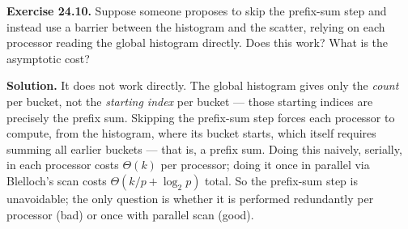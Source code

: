\begin{ppexercises}
\textbf{Exercise 24.10.} Suppose someone proposes to skip the prefix-sum
step and instead use a barrier between the histogram and the scatter,
relying on each processor reading the global histogram directly. Does
this work? What is the asymptotic cost?

\medskip
\textbf{Solution.} It does not work directly. The global histogram
gives only the \emph{count} per bucket, not the \emph{starting index}
per bucket --- those starting indices are precisely the prefix sum.
Skipping the prefix-sum step forces each processor to compute, from
the histogram, where its bucket starts, which itself requires summing
all earlier buckets --- that is, a prefix sum. Doing this naively,
serially, in each processor costs $\Theta(k)$ per processor; doing it
once in parallel via Blelloch's scan costs $\Theta(k/p + \log_2 p)$
total. So the prefix-sum step is unavoidable; the only question is
whether it is performed redundantly per processor (bad) or once with
parallel scan (good).
\end{ppexercises}

